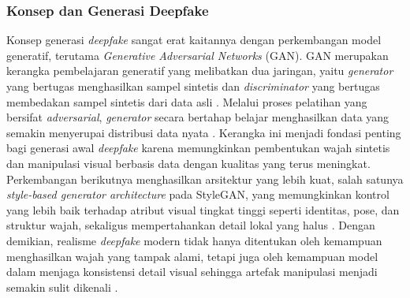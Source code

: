 \subsubsection{Konsep dan Generasi Deepfake} \label{II.Teori1.2}
Konsep generasi \textit{deepfake} sangat erat kaitannya dengan perkembangan model generatif, terutama \textit{Generative Adversarial Networks} (GAN). GAN merupakan kerangka pembelajaran generatif yang melibatkan dua jaringan, yaitu \textit{generator} yang bertugas menghasilkan sampel sintetis dan \textit{discriminator} yang bertugas membedakan sampel sintetis dari data asli \cite{NIPS2014_f033ed80}. Melalui proses pelatihan yang bersifat \textit{adversarial}, \textit{generator} secara bertahap belajar menghasilkan data yang semakin menyerupai distribusi data nyata \cite{NIPS2014_f033ed80}. Kerangka ini menjadi fondasi penting bagi generasi awal \textit{deepfake} karena memungkinkan pembentukan wajah sintetis dan manipulasi visual berbasis data dengan kualitas yang terus meningkat. Perkembangan berikutnya menghasilkan arsitektur yang lebih kuat, salah satunya \textit{style-based generator architecture} pada StyleGAN, yang memungkinkan kontrol yang lebih baik terhadap atribut visual tingkat tinggi seperti identitas, pose, dan struktur wajah, sekaligus mempertahankan detail lokal yang halus \cite{karras2019stylebasedgeneratorarchitecturegenerative}. Dengan demikian, realisme \textit{deepfake} modern tidak hanya ditentukan oleh kemampuan menghasilkan wajah yang tampak alami, tetapi juga oleh kemampuan model dalam menjaga konsistensi detail visual sehingga artefak manipulasi menjadi semakin sulit dikenali \cite{NIPS2014_f033ed80}\cite{karras2019stylebasedgeneratorarchitecturegenerative}. \par

